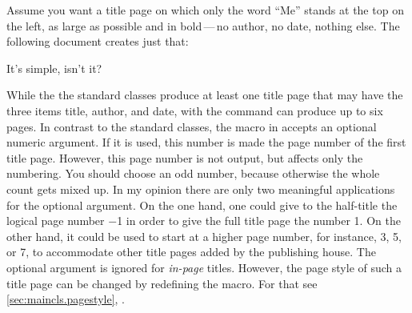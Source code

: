 \begin{Example}
  Assume you want a title page on which only the word ``Me'' stands at
  the top on the left, as large as possible and in bold\,---\,no
  author, no date, nothing else. The following document creates just
  that:
\ifCommonmaincls
{}
\else
{}
\fi
It's simple, isn't it?
\end{Example}
%


\begin{Declaration}
\end{Declaration}%
%
While the the standard classes produce at least one title page that may have
the three items title, author, and date, with {\KOMAScript} the
 command can produce up to six pages. In contrast to the
standard classes, the  macro in {\KOMAScript} accepts an
optional numeric argument. If it is used, this number is made the page number
of the first title page.  However, this page number is not output, but affects
only the numbering. You should choose an odd number, because otherwise the
whole count gets mixed up. In my opinion there are only two meaningful
applications for the optional argument. On the one hand, one could give to the
half-title the logical page number \(- in
order to give the full title page the number 1. On the other hand, it could be
used to start at a higher page number, for instance, 3, 5, or 7, to accommodate
other title pages added by the publishing house.  The optional argument is
ignored for \emph{in-page} titles. However, the page style of such a title
page can be changed by redefining the  macro.  For that
see \autoref{sec:maincls.pagestyle},
.

